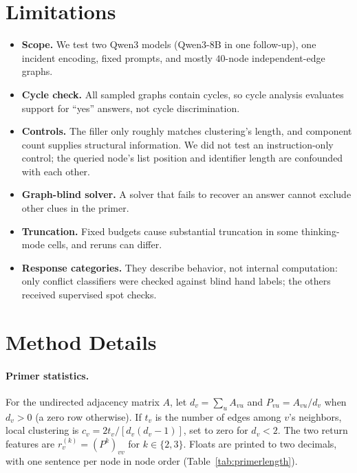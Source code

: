 \documentclass[11pt]{article}
\begin{document}
\clearpage
\section*{Limitations}
\begin{itemize}\setlength{\itemsep}{0pt}
\item \textbf{Scope.} We test two Qwen3 models (Qwen3-8B in one follow-up), one incident encoding, fixed prompts, and mostly $40$-node independent-edge graphs.
\item \textbf{Cycle check.} All sampled graphs contain cycles, so cycle analysis evaluates support for ``yes'' answers, not cycle discrimination.
\item \textbf{Controls.} The filler only roughly matches clustering's length, and component count supplies structural information. We did not test an instruction-only control; the queried node's list position and identifier length are confounded with each other.
\item \textbf{Graph-blind solver.} A solver that fails to recover an answer cannot exclude other clues in the primer.
\item \textbf{Truncation.} Fixed budgets cause substantial truncation in some thinking-mode cells, and reruns can differ.
\item \textbf{Response categories.} They describe behavior, not internal computation: only conflict classifiers were checked against blind hand labels; the others received supervised spot checks.
\end{itemize}



\appendix
\makeatletter
\setlength{\@fptop}{0pt}\setlength{\@fpsep}{\floatsep}
\setlength{\@dblfptop}{0pt}\setlength{\@dblfpsep}{\dblfloatsep}
\makeatother
\setlength{\textfloatsep}{10pt plus 2pt minus 2pt}
\setlength{\dbltextfloatsep}{10pt plus 2pt minus 2pt}
\setlength{\intextsep}{8pt plus 2pt minus 2pt}
\renewcommand{\topfraction}{0.9}\renewcommand{\dbltopfraction}{0.9}\renewcommand{\textfraction}{0.1}\setcounter{topnumber}{3}\setcounter{dbltopnumber}{2}
\clearpage
\section{Method Details}
\label{app:audit}

\paragraph{Primer statistics.} For the undirected adjacency matrix $A$, let $d_v=\sum_u A_{vu}$ and $P_{vu}=A_{vu}/d_v$ when $d_v>0$ (a zero row otherwise). If $t_v$ is the number of edges among $v$'s neighbors, local clustering is $c_v=2t_v/[d_v(d_v-1)]$, set to zero for $d_v<2$. The two return features are $r_v^{(k)}=(P^k)_{vv}$ for $k\in\{2,3\}$. Floats are printed to two decimals, with one sentence per node in node order (Table~\ref{tab:primerlength}).
\end{document}
